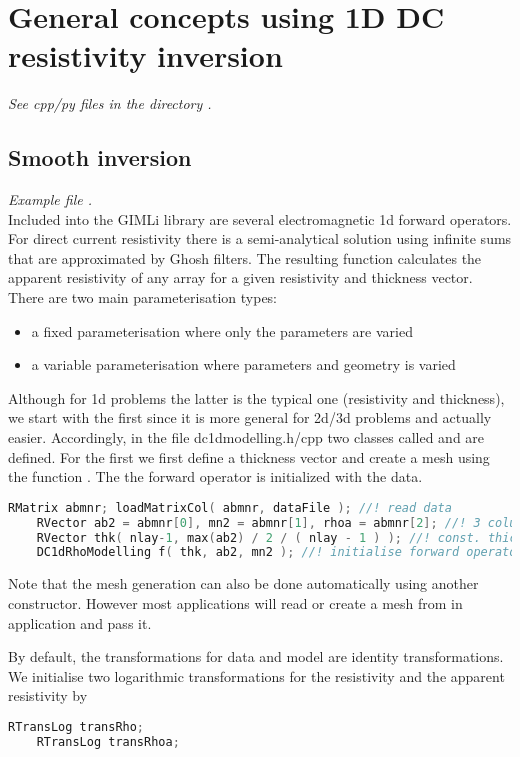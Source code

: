 \section{General concepts using 1D DC resistivity inversion}\label{sec:dc1d}
{\em See cpp/py files in the directory .}
\subsection{Smooth inversion}\label{sec:dc1dsmooth}
{\em Example file .}\\
Included into the GIMLi library are several electromagnetic 1d forward operators.
For direct current resistivity there is a semi-analytical solution using infinite sums that are approximated by Ghosh filters. 
The resulting function calculates the apparent resistivity of any array for a given resistivity and thickness vector.
There are two main parameterisation types:
\begin{itemize}
	\item a fixed parameterisation where only the parameters are varied 
	\item a variable parameterisation where parameters and geometry is varied
\end{itemize}

Although for 1d problems the latter is the typical one (resistivity and thickness), we start with the first since it is more general for 2d/3d problems and actually easier.
Accordingly, in the file dc1dmodelling.h/cpp two classes called  and  are defined.
For the first we first define a thickness vector and create a mesh using the function .
The the forward operator is initialized with the data.

\begin{lstlisting}[language=C++]
    RMatrix abmnr; loadMatrixCol( abmnr, dataFile ); //! read data
    RVector ab2 = abmnr[0], mn2 = abmnr[1], rhoa = abmnr[2]; //! 3 columns
    RVector thk( nlay-1, max(ab2) / 2 / ( nlay - 1 ) ); //! const. thickn.
    DC1dRhoModelling f( thk, ab2, mn2 ); //! initialise forward operator
\end{lstlisting}

Note that the mesh generation can also be done automatically using another constructor.
However most applications will read or create a mesh from in application and pass it.

By default, the transformations for data and model are identity transformations.
We initialise two logarithmic transformations for the resistivity and the apparent resistivity by 
\begin{lstlisting}[language=C++]
    RTransLog transRho;
    RTransLog transRhoa;
\end{lstlisting}

